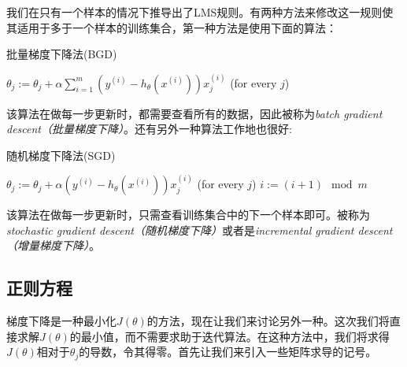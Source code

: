 \documentclass[hyperref, UTF8]{ctexart}
\begin{document}
我们在只有一个样本的情况下推导出了LMS规则。有两种方法来修改这一规则使其适用于多于一个样本的训练集合，第一种方法是使用下面的算法：
\begin{algorithm}[H]
\caption{批量梯度下降法(BGD)}  
\begin{algorithmic}    
\REPEAT  
\STATE $\theta_j := \theta_j + \alpha\sum_{i = 1}^m(y^{(i)} - h_\theta(x^{(i)}))x^{(i)}_j$ (for every $j$)
\end{algorithmic}  
\end{algorithm}
该算法在做每一步更新时，都需要查看所有的数据，因此被称为\emph{batch gradient descent（批量梯度下降）}。还有另外一种算法工作地也很好:
\begin{algorithm}[H]
\caption{随机梯度下降法(SGD)}  
\begin{algorithmic}    
\REPEAT  
\STATE $\theta_j := \theta_j + \alpha(y^{(i)} - h_\theta(x^{(i)}))x^{(i)}_j$ (for every $j$)
\STATE $i := (i + 1) \mod m$
\end{algorithmic}  
\end{algorithm}
该算法在做每一步更新时，只需查看训练集合中的下一个样本即可。被称为\emph{stochastic gradient descent（随机梯度下降）}或者是\emph{incremental gradient descent（增量梯度下降）}。

\subsection{正则方程}
梯度下降是一种最小化$J(\theta)$的方法，现在让我们来讨论另外一种。这次我们将直接求解$J(\theta)$的最小值，而不需要求助于迭代算法。在这种方法中，我们将求得$J(\theta)$相对于$\theta_j$的导数，令其得零。首先让我们来引入一些矩阵求导的记号。
\end{document}
